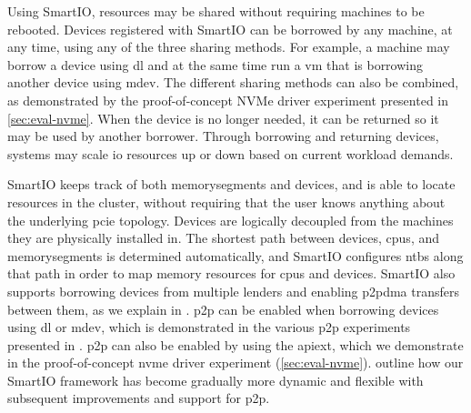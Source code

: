 \objdynamic*%
%
%
%
Using SmartIO, resources may be shared without requiring machines to be rebooted.
%
Devices registered with SmartIO can be borrowed by any machine, at any time, using any of the three sharing methods.
%
For example, a machine may borrow a device using \gls{dl} and at the same time run a \gls{vm} that is borrowing another device using \gls{mdev}.
%
The different sharing methods can also be combined, as demonstrated by the proof-of-concept NVMe driver experiment presented in \cref{sec:eval-nvme}.
%
When the device is no longer needed, it can be returned so it may be used by another \gls{borrower}.
%
Through borrowing and returning devices, systems may scale \gls{io} resources up or down based on current workload demands.



SmartIO keeps track of both \glspl{memorysegment} and devices, and is able to locate resources in the cluster, without requiring that the user knows anything about the underlying \gls{pcie} topology.
%
Devices are logically decoupled from the machines they are physically installed in. 
%
The shortest path between devices, \glspl{cpu}, and \glspl{memorysegment} is determined automatically, and SmartIO configures \glspl{ntb} along that path in order to map memory resources for \glspl{cpu} and devices.
%
SmartIO also supports borrowing devices from multiple \glspl{lender} and enabling \gls{p2pdma} transfers between them, as we explain in .
%
\Gls{p2p} can be enabled when borrowing devices using \gls{dl} or \gls{mdev}, which is demonstrated in the various \gls{p2p} experiments presented in .
%
\Gls{p2p} can also be enabled by using the \gls{apiext}, which we demonstrate in the proof-of-concept \gls{nvme} driver experiment (\cref{sec:eval-nvme}).
%
 outline how our SmartIO framework has become gradually more dynamic and flexible with subsequent improvements and support for \gls{p2p}.

